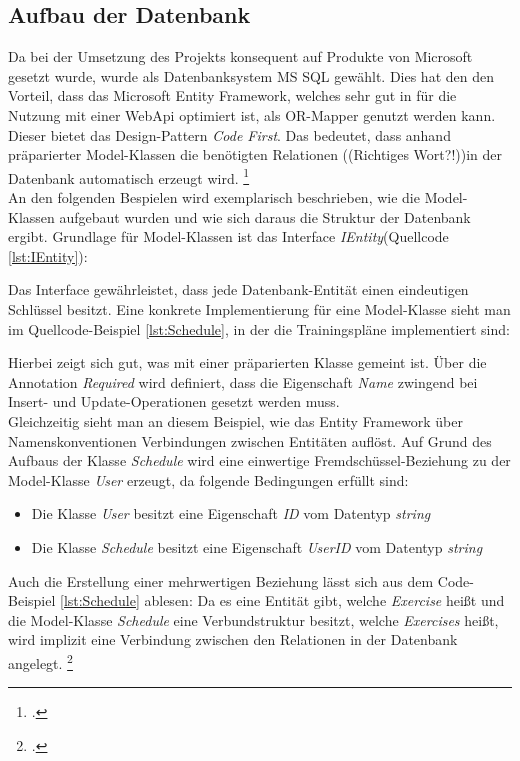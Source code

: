 \subsection{Aufbau der Datenbank}
\label{ssec:aufbau-server-db}
Da bei der Umsetzung des Projekts konsequent auf Produkte von Microsoft gesetzt wurde, wurde als Datenbanksystem \ac{MS SQL} gewählt. Dies hat den den Vorteil, dass das \ac{Microsoft Entity Framework}, welches sehr gut in für die Nutzung mit einer WebApi optimiert ist, als \gls{OR-Mapper} genutzt werden kann. Dieser bietet das Design-Pattern \textit{Code First}. Das bedeutet, dass anhand präparierter Model-Klassen die benötigten Relationen ((Richtiges Wort?!))in der Datenbank automatisch erzeugt wird. \footcite{entity-framework-code-first}\\
An den folgenden Bespielen wird exemplarisch beschrieben, wie die Model-Klassen aufgebaut wurden und wie sich daraus die Struktur der Datenbank ergibt. Grundlage für Model-Klassen ist das Interface \textit{IEntity}(Quellcode \ref{lst:IEntity}):

Das Interface gewährleistet, dass jede Datenbank-Entität einen eindeutigen Schlüssel besitzt.
Eine konkrete Implementierung für eine Model-Klasse sieht man im Quellcode-Beispiel \ref{lst:Schedule}, in der die Trainingspläne implementiert sind:

Hierbei zeigt sich gut, was mit einer präparierten Klasse gemeint ist. Über die Annotation \textit{Required} wird definiert, dass die Eigenschaft \textit{Name} zwingend bei Insert- und Update-Operationen gesetzt werden muss. \\
Gleichzeitig sieht man an diesem Beispiel, wie das Entity Framework über Namenskonventionen Verbindungen zwischen Entitäten auflöst. Auf Grund des Aufbaus der Klasse \textit{Schedule} wird eine \ac{einwertige Fremdschüssel}-Beziehung zu der Model-Klasse \textit{User} erzeugt, da folgende Bedingungen erfüllt sind:
\begin{itemize}
\item Die Klasse \textit{User} besitzt eine Eigenschaft \textit{ID} vom Datentyp \textit{string}
\item Die Klasse \textit{Schedule} besitzt eine Eigenschaft \textit{UserID} vom Datentyp \textit{string}
\end{itemize}
Auch die Erstellung einer \ac{mehrwertigen} Beziehung lässt sich aus dem Code-Beispiel \ref{lst:Schedule} ablesen: Da es eine Entität gibt, welche \textit{Exercise} heißt und die Model-Klasse \textit{Schedule} eine Verbundstruktur besitzt, welche \textit{Exercises} heißt, wird implizit eine Verbindung zwischen den Relationen in der Datenbank angelegt. \footcite{entity-framework-code-first}
